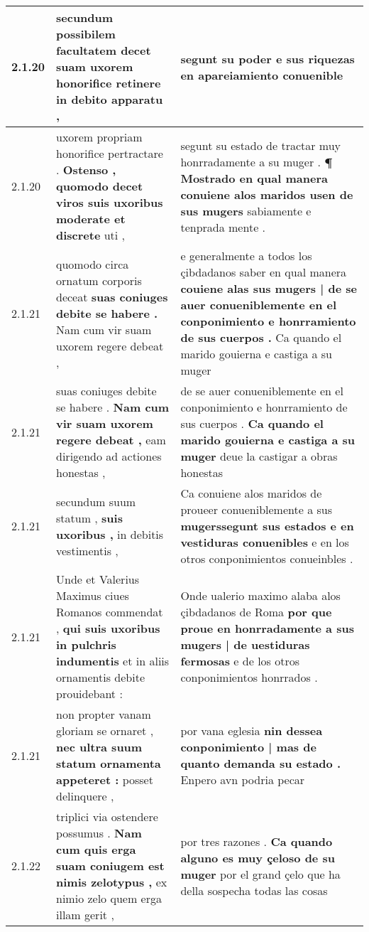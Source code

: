 \begin{tabular}{|p{1cm}|p{6.5cm}|p{6.5cm}|}
2.1.20 & secundum possibilem facultatem decet \textbf{ suam uxorem honorifice retinere } in debito apparatu , & segunt su poder \textbf{ e sus riquezas } en apareiamiento conuenible \\\hline
2.1.20 & uxorem propriam honorifice pertractare . \textbf{ Ostenso , quomodo decet viros suis uxoribus moderate et discrete } uti , & segunt su estado de tractar muy honrradamente a su muger . \textbf{ ¶ Mostrado en qual manera conuiene alos maridos usen de sus mugers } sabiamente e tenprada mente . \\\hline
2.1.21 & quomodo circa ornatum corporis deceat \textbf{ suas coniuges debite se habere . } Nam cum vir suam uxorem regere debeat , & e generalmente a todos los çibdadanos saber en qual manera \textbf{ couiene alas sus mugers | de se auer conueniblemente en el conponimiento e honrramiento de sus cuerpos . } Ca quando el marido gouierna e castiga a su muger \\\hline
2.1.21 & suas coniuges debite se habere . \textbf{ Nam cum vir suam uxorem regere debeat , } eam dirigendo ad actiones honestas , & de se auer conueniblemente en el conponimiento e honrramiento de sus cuerpos . \textbf{ Ca quando el marido gouierna e castiga a su muger } deue la castigar a obras honestas \\\hline
2.1.21 & secundum suum statum , \textbf{ suis uxoribus , } in debitis vestimentis , & Ca conuiene alos maridos de proueer conueniblemente a sus \textbf{ mugerssegunt sus estados e en vestiduras conuenibles } e en los otros conponimientos conueinbles . \\\hline
2.1.21 & Unde et Valerius Maximus ciues Romanos commendat , \textbf{ qui suis uxoribus in pulchris indumentis } et in aliis ornamentis debite prouidebant : & Onde ualerio maximo alaba alos çibdadanos de Roma \textbf{ por que proue en honrradamente a sus mugers | de uestiduras fermosas } e de los otros conponimientos honrrados . \\\hline
2.1.21 & non propter vanam gloriam se ornaret , \textbf{ nec ultra suum statum ornamenta appeteret : } posset delinquere , & por vana eglesia \textbf{ nin dessea conponimiento | mas de quanto demanda su estado . } Enpero avn podria pecar \\\hline
2.1.22 & triplici via ostendere possumus . \textbf{ Nam cum quis erga suam coniugem est nimis zelotypus , } ex nimio zelo quem erga illam gerit , & por tres razones . \textbf{ Ca quando alguno es muy çeloso de su muger } por el grand çelo que ha della sospecha todas las cosas \\\hline

\end{tabular}
